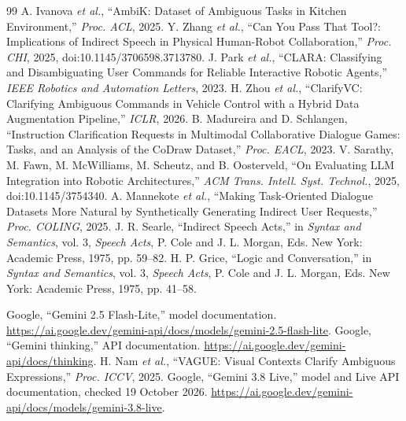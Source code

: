 \documentclass[10pt,conference]{IEEEtran}
\begin{document}
\balance
\begin{thebibliography}{99}
 A. Ivanova \emph{et al.}, ``AmbiK: Dataset of Ambiguous Tasks in Kitchen Environment,'' \emph{Proc. ACL}, 2025.
 Y. Zhang \emph{et al.}, ``Can You Pass That Tool?: Implications of Indirect Speech in Physical Human-Robot Collaboration,'' \emph{Proc. CHI}, 2025, doi:10.1145/3706598.3713780.
 J. Park \emph{et al.}, ``CLARA: Classifying and Disambiguating User Commands for Reliable Interactive Robotic Agents,'' \emph{IEEE Robotics and Automation Letters}, 2023.
 H. Zhou \emph{et al.}, ``ClarifyVC: Clarifying Ambiguous Commands in Vehicle Control with a Hybrid Data Augmentation Pipeline,'' \emph{ICLR}, 2026.
 B. Madureira and D. Schlangen, ``Instruction Clarification Requests in Multimodal Collaborative Dialogue Games: Tasks, and an Analysis of the CoDraw Dataset,'' \emph{Proc. EACL}, 2023.
 V. Sarathy, M. Fawn, M. McWilliams, M. Scheutz, and B. Oosterveld, ``On Evaluating LLM Integration into Robotic Architectures,'' \emph{ACM Trans. Intell. Syst. Technol.}, 2025, doi:10.1145/3754340.
 A. Mannekote \emph{et al.}, ``Making Task-Oriented Dialogue Datasets More Natural by Synthetically Generating Indirect User Requests,'' \emph{Proc. COLING}, 2025.
 J. R. Searle, ``Indirect Speech Acts,'' in \emph{Syntax and Semantics}, vol. 3, \emph{Speech Acts}, P. Cole and J. L. Morgan, Eds. New York: Academic Press, 1975, pp. 59--82.
 H. P. Grice, ``Logic and Conversation,'' in \emph{Syntax and Semantics}, vol. 3, \emph{Speech Acts}, P. Cole and J. L. Morgan, Eds. New York: Academic Press, 1975, pp. 41--58.



 Google, ``Gemini 2.5 Flash-Lite,'' model documentation. \url{https://ai.google.dev/gemini-api/docs/models/gemini-2.5-flash-lite}.
 Google, ``Gemini thinking,'' API documentation. \url{https://ai.google.dev/gemini-api/docs/thinking}.
 H. Nam \emph{et al.}, ``VAGUE: Visual Contexts Clarify Ambiguous Expressions,'' \emph{Proc. ICCV}, 2025.
 Google, ``Gemini 3.8 Live,'' model and Live API documentation, checked 19 October 2026. \url{https://ai.google.dev/gemini-api/docs/models/gemini-3.8-live}.
\end{thebibliography}
\end{document}
